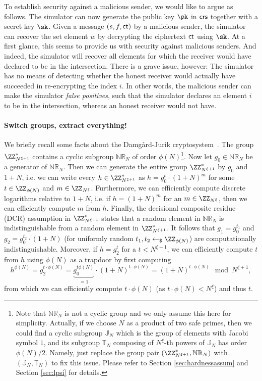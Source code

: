 To establish security against a malicious sender, we would like to argue as follows. The simulator can now generate the public key $\pk$ in $\mathsf{crs}$ together with a secret key $\sk$. Given a message $(s,f,\mathsf{ct})$ by a malicious sender, the simulator can recover the set element $w$ by decrypting the ciphertext $\mathsf{ct}$ using $\sk$. At a first glance, this seems to provide us with security against malicious senders. And indeed, the simulator will recover all elements for which the receiver would have declared to be in the intersection. There is a grave issue, however: The simulator has no means of detecting whether the honest receiver would actually have succeeded in re-encrypting the index $i$. In other words, the malicious sender can make the simulator \emph{false positives}, such that the simulator declares an element $i$ to be in the intersection, whereas an honest receiver would not have.

\paragraph{Switch groups, extract everything!}

We briefly recall some facts about the Damg\aa rd-Jurik cryptosystem~\cite{PKC:DamJur01}. The group $\ZZ_{N^{\xi + 1}}^\ast$ contains a cyclic subgroup $\mathbb{NR}_N$ of order $\phi(N)$\footnote{Note that $\mathbb{NR}_N$ is not a cyclic group and we only assume this here for simplicity. Actually, if we choose $N$ as a product of two safe primes, then we could find a cyclic subgroup $\mathbb{J}_N$ which is the group of elements with Jacobi symbol $1$, and its subgroup $\mathbb{T}_N$ composing of $N^\xi$-th powers of $\mathbb{J}_N$ has order $\phi(N)/2$. Namely, just replace the group pair $(\ZZ^\ast_{N^{\xi+1}},\mathbb{NR}_N)$ with $(\mathbb{J}_N, \mathbb{T}_N)$ to fix this issue. Please refer to Section \ref{sec:hardnessassum} and Section \ref{sec:lpsi}  for details.}. Now let $g_0 \in \mathbb{NR}_N$ be a generator of $\mathbb{NR}_N$. Then we can generate the entire group $\ZZ_{N^{\xi + 1}}^\ast$ by $g_0$ and $1 + N$, i.e. we can write every $h \in \ZZ_{N^{\xi + 1}}^\ast$ as $h = g_0^t \cdot (1 + N)^m$ for some $t \in \ZZ_{\phi(N)}$ and $m \in \ZZ_{N^\xi}$. Furthermore, we can efficiently compute discrete logarithms relative to $1 + N$, i.e. if $h = (1 + N)^m$ for an $m \in \ZZ_{N^\xi}$, then we can efficiently compute $m$ from $h$. Finally, the decisional composite residue (DCR) assumption in $\ZZ_{N^{\xi + 1}}^\ast$ states that a random element in $\mathbb{NR}_N$ is indistinguishable from a random element in $\ZZ_{N^{\xi + 1}}^\ast$. It follows that $g_1 = g_0^{t_1}$ and $g_2 = g_0^{t_2} \cdot (1 + N)$ (for uniformly random $t_1,t_2 \pick \ZZ_{\phi(N)}$) are computationally indistinguishable. Moreover, if $h = g_2^{t}$ for a $t < N^{\xi-1}$, we can efficiently compute $t$  from $h$ using $\phi(N)$ as a trapdoor by first computing
\[
h^{\phi(N)} = g_2^{t \cdot \phi(N)} = \underbrace{g_0^{t \phi(N)}}_{= 1} \cdot (1 + N)^{t \cdot \phi(N)} = (1 + N)^{t \cdot \phi(N)} \mod N^{\xi+1},
\]
from which we can efficiently compute $t \cdot \phi(N)$ (as $t \cdot \phi(N) < N^{\xi}$) and thus $t$.

